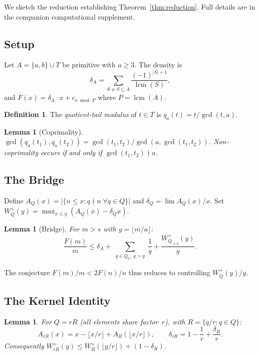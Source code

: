 \documentclass[11pt,a4paper]{amsart}
\theoremstyle{plain}
\newtheorem{lemma}[theorem]{Lemma}
\theoremstyle{definition}
\newtheorem{definition}[theorem]{Definition}
\newcommand{\lcmop}{\operatorname{lcm}}
\begin{document}
We sketch the reduction establishing Theorem~\ref{thm:reduction}. Full details 
are in the companion computational supplement.

\subsection{Setup}

Let $A = \{a,b\} \cup T$ be primitive with $a \geq 3$. The density is
\[
\delta_A = \sum_{\emptyset \neq S \subseteq A} \frac{(-1)^{|S|+1}}{\lcmop(S)},
\]
and $F(x) = \delta_A \cdot x + c_{x \bmod P}$ where $P = \lcmop(A)$.

\begin{definition}
The \emph{quotient-tail modulus} of $t \in T$ is $q_a(t) = t/\gcd(t,a)$.
\end{definition}

\begin{lemma}[Coprimality]\label{lem:coprime}
$\gcd(q_a(t_1), q_a(t_2)) = \gcd(t_1,t_2)/\gcd(a, \gcd(t_1,t_2))$.
Non-coprimality occurs if and only if $\gcd(t_1,t_2) \nmid a$.
\end{lemma}

\subsection{The Bridge}

Define $A_Q(x) = |\{n \leq x : q \nmid n\;\forall q \in Q\}|$ and 
$\delta_Q = \lim A_Q(x)/x$. Set $W^+_Q(y) = \max_{x \leq y}(A_Q(x) - \delta_Q x)$.

\begin{lemma}[Bridge]\label{lem:bridge}
For $m > s$ with $y = \lfloor m/a \rfloor$:
\[
\frac{F(m)}{m} \leq \delta_A + \sum_{\substack{q \in Q_a,\; q > y}} \frac{1}{q} 
+ \frac{W^+_{Q_{\leq y}}(y)}{y}.
\]
\end{lemma}

The conjecture $F(m)/m < 2F(n)/n$ thus reduces to controlling $W^+_Q(y)/y$.

\subsection{The Kernel Identity}

\begin{lemma}\label{lem:kernel}
For $Q = rR$ (all elements share factor~$r$), with $R = \{q/r : q \in Q\}$:
\[
A_{rR}(x) = x - \lfloor x/r \rfloor + A_R(\lfloor x/r \rfloor), \qquad
\delta_{rR} = 1 - \frac{1}{r} + \frac{\delta_R}{r}.
\]
Consequently $W^+_{rR}(y) \leq W^+_R(\lfloor y/r \rfloor) + (1 - \delta_R)$.
\end{lemma}
\end{document}
